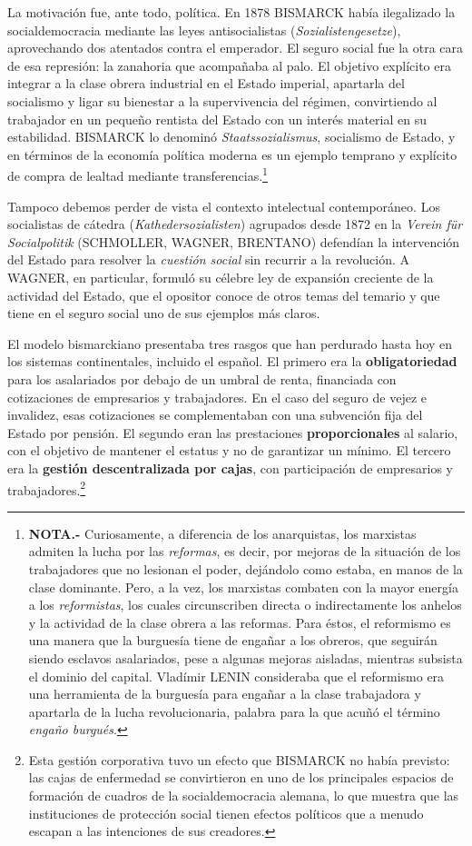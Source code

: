 \documentclass[10pt,a4paper]{article}
\begin{document}
La motivación fue, ante todo, política. En 1878 BISMARCK había ilegalizado la socialdemocracia mediante las leyes antisocialistas (\textit{Sozialistengesetze}), aprovechando dos atentados contra el emperador. El seguro social fue la otra cara de esa represión: la zanahoria que acompañaba al palo. El objetivo explícito era integrar a la clase obrera industrial en el Estado imperial, apartarla del socialismo y ligar su bienestar a la supervivencia del régimen, convirtiendo al trabajador en un pequeño rentista del Estado con un interés material en su estabilidad. BISMARCK lo denominó \textit{Staatssozialismus}, socialismo de Estado, y en términos de la economía política moderna es un ejemplo temprano y explícito de compra de lealtad mediante transferencias.\footnote{\textbf{NOTA.-} Curiosamente, a diferencia de los anarquistas, los marxistas admiten la lucha por las \textit{reformas}, es decir, por mejoras de la situación de los trabajadores que no lesionan el poder, dejándolo como estaba, en manos de la clase dominante. Pero, a la vez, los marxistas combaten con la mayor energía a los \textit{reformistas}, los cuales circunscriben directa o indirectamente los anhelos y la actividad de la clase obrera a las reformas. Para éstos, el reformismo es una manera que la burguesía tiene de engañar a los obreros, que seguirán siendo esclavos asalariados, pese a algunas mejoras aisladas, mientras subsista el dominio del capital. Vladímir LENIN consideraba que el reformismo era una herramienta de la burguesía para engañar a la clase trabajadora y apartarla de la lucha revolucionaria, palabra para la que acuñó el término \textit{engaño burgués}.
}

Tampoco debemos perder de vista el contexto intelectual contemporáneo. Los socialistas de cátedra (\textit{Kathedersozialisten}) agrupados desde 1872 en la \textit{Verein für Socialpolitik} (SCHMOLLER, WAGNER, BRENTANO) defendían la intervención del Estado para resolver la \textit{cuestión social} sin recurrir a la revolución. A WAGNER, en particular, formuló su célebre ley de expansión creciente de la actividad del Estado, que el opositor conoce de otros temas del temario y que tiene en el seguro social uno de sus ejemplos más claros.

El modelo bismarckiano presentaba tres rasgos que han perdurado hasta hoy en los sistemas continentales, incluido el español. El primero era la \textbf{obligatoriedad} para los asalariados por debajo de un umbral de renta, financiada con cotizaciones de empresarios y trabajadores. En el caso del seguro de vejez e invalidez, esas cotizaciones se complementaban con una subvención fija del Estado por pensión. El segundo eran las prestaciones \textbf{proporcionales} al salario, con el objetivo de mantener el estatus y no de garantizar un mínimo. El tercero era la \textbf{gestión descentralizada por cajas}, con participación de empresarios y trabajadores.\footnote{Esta gestión corporativa tuvo un efecto que BISMARCK no había previsto: las cajas de enfermedad se convirtieron en uno de los principales espacios de formación de cuadros de la socialdemocracia alemana, lo que muestra que las instituciones de protección social tienen efectos políticos que a menudo escapan a las intenciones de sus creadores.
}
\end{document}
